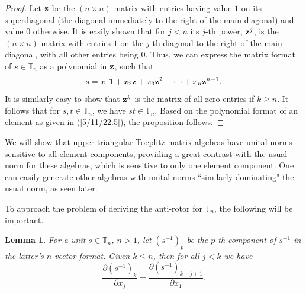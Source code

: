 \documentclass{amsart}
\newtheorem{lemma}[theorem]{Lemma}
\theoremstyle{definition}
\numberwithin{theorem}{section}
\numberwithin{equation}{section}
\begin{document}
 \begin{proof}
Let ${\bf z}$ be the $(n \times n)$-matrix with entries having value $1$ on its superdiagonal  (the diagonal immediately to the right of the main diagonal) and value $0$ otherwise.  It is easily shown that for $j<n$ its $j$-th power, ${\bf z}^j$, is the $(n\times n)$-matrix with entries $1$ on the $j$-th diagonal to the right of the main diagonal, with all other entries being $0$.   Thus, we can express the matrix format of $s\in\mathbb{T}_n$ as a polynomial in ${\bf z}$, such that
\begin{equation}\label{5/11/22.5} s = x_1 {\bf 1} + x_2 {\bf z} + x_3 {\bf z}^2 + \cdots + x_n {\bf z}^{n-1}.\end{equation}  It is similarly easy to show that ${\bf z}^k$ is the matrix of all zero entries if $k\ge n$.  It follows that for $s,t\in \mathbb{T}_n$, we have $st\in \mathbb{T}_n$.   Based on the polynomial format of an element as given in (\ref{5/11/22.5}), the proposition follows.
 \end{proof}
 

We will show that upper triangular Toeplitz matrix algebras have unital norms sensitive to all element components, providing a great contrast with the usual norm for these algebras, which is sensitive to only one element component.  One can easily generate other algebras with unital norms ``similarly dominating" the usual norm, as seen later.

To approach the problem of deriving the anti-rotor for $\mathbb{T}_n$, the following will be important.

\begin{lemma} \label{5/7/22.15} For a unit $s\in \mathbb{T}_n$,  $n>1$, let $\left( s^{-1} \right)_p$ be the $p$-th component of $s^{-1}$ in the latter's $n$-vector format.  Given $k\le n$, then for all $j<k$ we have \begin{equation}\label{5/6/22.10} \frac{\partial \left( s^{-1} \right)_k}{\partial x_j} = \frac{\partial \left( s^{-1} \right)_{k-j+1}}{\partial x_1}.\end{equation}
\end{lemma}
\end{document}
